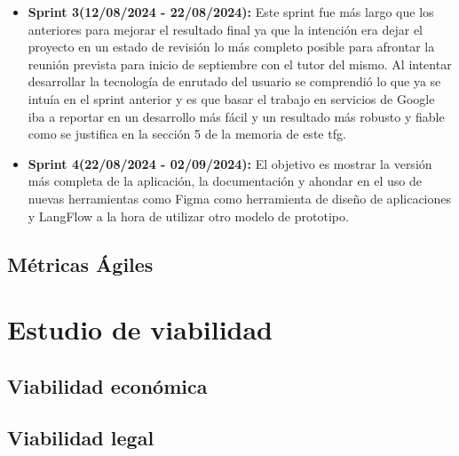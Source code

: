 \begin{itemize}
    \item \textbf{Sprint 3(12/08/2024 - 22/08/2024):} Este sprint fue más largo que los anteriores para mejorar el resultado final ya que la intención era dejar el proyecto en un estado de revisión lo más completo posible para afrontar la reunión prevista para inicio de septiembre con el tutor del mismo. Al intentar desarrollar la tecnología de enrutado del usuario se comprendió lo que ya se intuía en el sprint anterior y es que basar el trabajo en servicios de Google iba a reportar en un desarrollo más fácil y un resultado más robusto y fiable como se justifica en la sección 5 de la memoria de este \acrshort{tfg}.
    
    \item \textbf{Sprint 4(22/08/2024 - 02/09/2024):} El objetivo es mostrar la versión más completa de la aplicación, la documentación y ahondar en el uso de nuevas herramientas como Figma como herramienta de diseño de aplicaciones y LangFlow a la hora de utilizar otro modelo de prototipo.
    
\end{itemize}

\subsection{Métricas Ágiles}

\section{Estudio de viabilidad}

\subsection{Viabilidad económica}

\subsection{Viabilidad legal}


